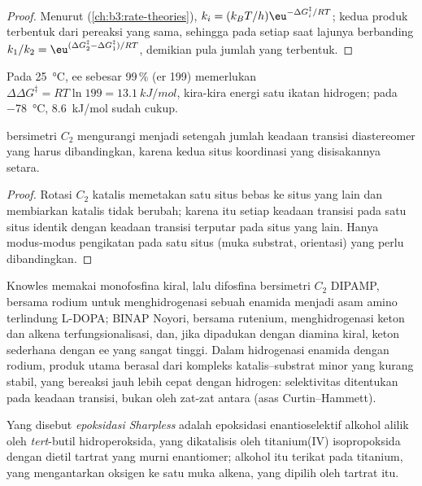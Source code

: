 \begin{proof}
Menurut  (\cref{ch:b3:rate-theories}),
$k_i = (k_BT/h)\eu^{-\Delta G_i^\ddagger/RT}$; kedua produk terbentuk dari pereaksi yang sama, sehingga pada setiap saat
lajunya berbanding $k_1/k_2 = \eu^{(\Delta G_2^\ddagger - \Delta G_1^\ddagger)/RT}$, demikian pula jumlah yang terbentuk.
\end{proof}

Pada \qty{25}{\celsius}, ee sebesar 99\,\% (er 199) memerlukan $\Delta\Delta G^\ddagger = RT\ln 199 = \qty{13.1}{kJ/mol}$, kira-kira energi
satu ikatan hidrogen; pada \qty{-78}{\celsius}, \qty{8.6}{kJ/mol} sudah cukup.

\begin{proposition}\label{prop:b3:asymmetric-synthesis:c2}
 bersimetri $C_2$ mengurangi menjadi setengah jumlah keadaan transisi
diastereomer yang harus dibandingkan, karena kedua situs koordinasi yang disisakannya
setara.
\end{proposition}

\begin{proof}
Rotasi $C_2$ katalis memetakan satu situs bebas ke situs yang lain dan membiarkan
katalis tidak berubah; karena itu setiap keadaan transisi pada satu situs identik dengan
keadaan transisi terputar pada situs yang lain. Hanya modus-modus pengikatan pada satu situs (muka substrat,
orientasi) yang perlu dibandingkan.
\end{proof}

Knowles memakai monofosfina kiral, lalu difosfina bersimetri $C_2$ DIPAMP, bersama rodium untuk
menghidrogenasi sebuah enamida menjadi asam amino terlindung L-DOPA; BINAP Noyori,
bersama rutenium, menghidrogenasi keton dan alkena terfungsionalisasi, dan,
jika dipadukan dengan diamina kiral, keton sederhana dengan ee yang sangat tinggi. Dalam
hidrogenasi enamida dengan rodium, produk utama berasal dari kompleks katalis--substrat minor
yang kurang stabil, yang bereaksi jauh lebih cepat dengan hidrogen:
selektivitas ditentukan pada keadaan transisi, bukan oleh 
zat-zat antara (asas Curtin--Hammett).

\begin{definition}\label{def:b3:asymmetric-synthesis:sharpless}
Yang disebut \emph{epoksidasi Sharpless} adalah
epoksidasi enantioselektif alkohol alilik oleh \textit{tert}-butil hidroperoksida,
yang dikatalisis oleh titanium(IV) isopropoksida dengan dietil tartrat yang murni enantiomer;
alkohol itu terikat pada titanium, yang mengantarkan oksigen ke satu muka
alkena, yang dipilih oleh tartrat itu.
\end{definition}

